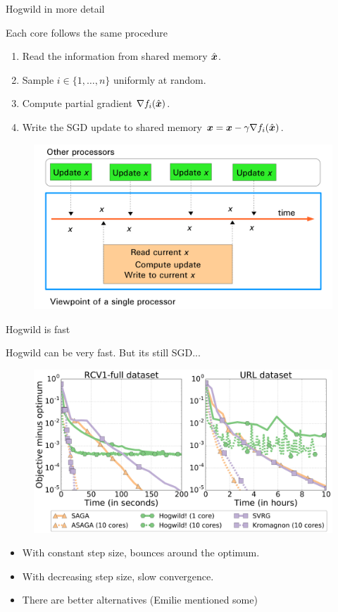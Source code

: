 \documentclass[10pt]{beamer}
\begin{document}
\begin{frame}{Hogwild in more detail}


Each core follows the same procedure
\begin{enumerate}
\item Read the information from shared memory $\hat{{\boldsymbol x}}$.
\item Sample $i \in \{1, \ldots, n\}$ uniformly at random.
\item Compute partial gradient $\nabla f_i(\hat{{\boldsymbol x}})$.
\item Write the SGD update to shared memory ${\boldsymbol x} = {\boldsymbol x} - \gamma \nabla f_i(\hat{{\boldsymbol x}})$.
\end{enumerate}
\pause
\begin{figure}
\centering\includegraphics[width=0.6\linewidth]{img/async_updates}
\end{figure}
\end{frame}

\begin{frame}{Hogwild is fast}

Hogwild can be very fast. 
But its still SGD...

\begin{figure}
\includegraphics[width=0.8\linewidth]{img/figure_comparison_hogwild}
\end{figure}

\begin{itemize}
\item With constant step size, bounces around the optimum.

\item With decreasing step size, slow convergence.

\item There are better alternatives (Emilie mentioned some)
\end{itemize}
\end{frame}
\end{document}
